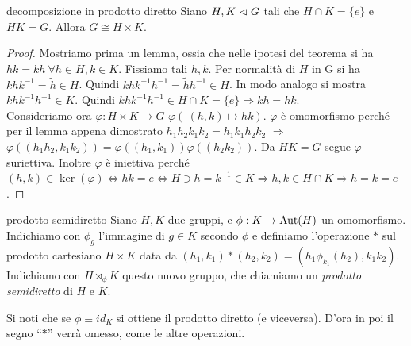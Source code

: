 \begin{theorem}{decomposizione in prodotto diretto}
    Siano $H,K \vartriangleleft G$ tali che $H \cap K = \{e\}$ e $HK = G$. Allora $G \cong H \times K$.
\end{theorem}
\begin{proof}
    Mostriamo prima un lemma, ossia che nelle ipotesi del teorema si ha $hk = kh \ \forall h\in H, k \in K$. Fissiamo tali $h,k$. Per normalità di $H$ in G si ha $khk^{-1} = \tilde h \in H$. Quindi $khk^{-1}h^{-1} = \tilde h h^{-1} \in H$. In modo analogo si mostra  $khk^{-1}h^{-1} \in K$. Quindi $khk^{-1}h^{-1} \in H \cap K = \{ e\} \Rightarrow kh= hk$. \\Consideriamo ora $\varphi: H \times K \to G$ $\varphi(\ (h,k) \mapsto hk)$. $\varphi$ è omomorfismo perché per il lemma appena dimostrato $h_1h_2k_1k_2 =  h_1k_1h_2k_2$ $\Rightarrow$ $\varphi((h_1h_2, k_1k_2)) =\varphi((h_1, k_1)) \varphi((h_2k_2))$.  Da $HK = G$ segue $\varphi$ suriettiva. Inoltre $\varphi$ è iniettiva perché $(h,k) \in \ker(\varphi) \iff hk = e \iff H \ni h = k^{-1} \in K \Rightarrow h,k \in H\cap K \Rightarrow h=k=e$.
\end{proof}
\begin{definition}{prodotto semidiretto}
    Siano $H, K$ due gruppi, e $\phi: K \rightarrow \text{Aut}(H)$ un omomorfismo. Indichiamo con $\phi_g$ l'immagine di $g\in K$ secondo $\phi$ e definiamo l'operazione $*$ sul prodotto cartesiano $H \times K$ data da $(h_1,k_1)*(h_2,k_2) = (h_1\phi_{k_1}(h_2), k_1k_2)$. Indichiamo con $H \rtimes_{\phi} K$ questo nuovo gruppo, che chiamiamo un \textit{prodotto semidiretto} di $H$ e $K$.
\end{definition}

Si noti che se $\phi \equiv id_{K}$ si ottiene il prodotto diretto (e viceversa). D'ora in poi il segno ``$*$'' verrà omesso, come le altre operazioni.

